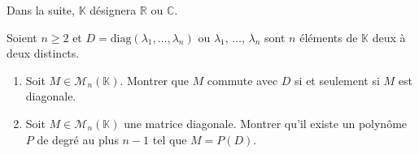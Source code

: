 \documentclass[a4paper,10pt]{report}
\begin{document}
\everymath{\displaystyle}

\begin{center}
\end{center}


\bigskip

\noindent Dans la suite, $\mathbb{K}$ désignera $\mathbb{R}$ ou $\mathbb{C}$.

\medskip

\begin{Exercice}{} Soient $n \geq 2$ et $D= \textrm{diag}(\lambda_1, \ldots, \lambda_n)$ ou $\lambda_1$, $\ldots$, $\lambda_n$ sont $n$ éléments de $\mathbb{K}$ deux à deux distincts.
\begin{enumerate}
\item Soit $M \in \mathcal{M}_n(\mathbb{K})$. Montrer que $M$ commute avec $D$ si et seulement si $M$ est diagonale.
\item Soit $M \in \mathcal{M}_n(\mathbb{K})$ une matrice diagonale. Montrer qu'il existe un polynôme $P$ de degré au plus $n-1$ tel que $M=P(D)$.
\end{enumerate}
\end{Exercice}
\end{document}
